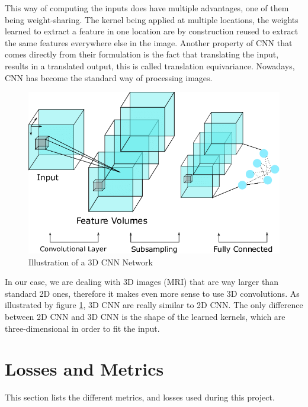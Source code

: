 This way of computing the inputs does have multiple advantages, one of them being weight-sharing. The kernel being applied at multiple locations, the weights learned to extract a feature in one location are by construction reused to extract the same features everywhere else in the image. Another property of CNN that comes directly from their formulation is the fact that translating the input, results in a translated output, this is called translation equivariance. Nowadays, CNN has become the standard way of processing images.
\begin{figure}
 \centering
 \includegraphics[width=.9\linewidth]{figures/3D_CNN_example.png}
 \captionsetup{width=.9\linewidth}
 \caption[3D_CNN_example]{Illustration\footnotemark{} of a 3D CNN Network}
 \label{fig:3d_cnn_example}
\end{figure}


In our case, we are dealing with 3D images (MRI) that are way larger than standard 2D ones, therefore it makes even more sense to use 3D convolutions. As illustrated by figure \ref{fig:3d_cnn_example}, 3D CNN are really similar to 2D CNN. The only difference between 2D CNN and 3D CNN is the shape of the learned kernels, which are three-dimensional in order to fit the input.


\section{Losses and Metrics}
\label{sec:losses_metrics}
This section lists the different metrics, and losses used during this project.

